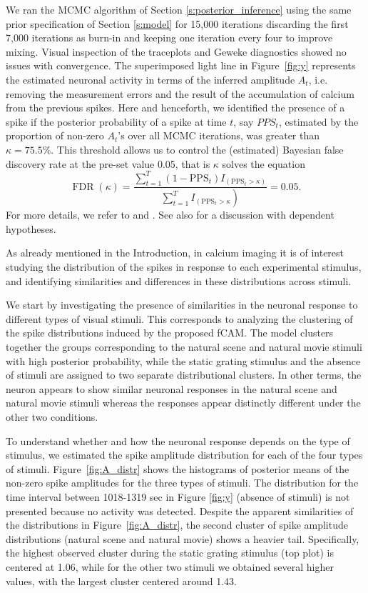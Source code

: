 We ran the MCMC algorithm of Section \ref{s:posterior_inference} using the same prior specification of Section \ref{s:model} for 15{,}000 iterations discarding the first 7{,}000 iterations as burn-in and keeping one iteration every four to improve mixing.  Visual inspection of the traceplots and Geweke diagnostics showed no issues with convergence. 
%
The superimposed light line in Figure~\ref{fig:y} represents the estimated neuronal activity in terms of the inferred amplitude $A_t$, i.e. removing the measurement errors and the result of the accumulation of calcium from the previous spikes. Here and henceforth, we identified the presence of a spike if the  posterior probability of a spike at time $t$, say $PPS_t$, estimated by the proportion of non-zero $A_t$'s over all MCMC iterations, was greater than  $\kappa=75.5\%$. This threshold allows us to control the (estimated) Bayesian false discovery rate at the pre-set value 0.05, that is $\kappa$ solves the equation $$\operatorname{FDR}\left(\kappa\right)=\frac{\sum_{t=1}^{T}\left(1-\mathrm{PPS}_{t}\right) I_{\left(\mathrm{PPS}_{t}>\kappa\right)}}{ \left.\sum_{t=1}^{T} I_{\left(\mathrm{PPS}_{t}>\kappa\right.}\right)}=0.05.$$ For more details, we refer to \textcite{newton2004} and \textcite{Muller07}. See also \textcite{SunReich2015} for a discussion with dependent hypotheses.
%

%
As already mentioned in the Introduction, in calcium imaging it is of interest studying the distribution of the spikes in response to each experimental stimulus, and identifying similarities and differences in these distributions across stimuli. 

We start by investigating the presence of similarities in the neuronal response to different types of visual stimuli. This corresponds to analyzing the clustering of the spike distributions induced by the proposed fCAM. The model clusters together the groups corresponding to the natural scene and natural movie stimuli with high posterior probability, while the static grating stimulus and the absence of stimuli are assigned to two separate distributional clusters. In other terms, the neuron appears to show similar neuronal responses in the natural scene and natural movie stimuli whereas the responses appear distinctly different under the other two conditions. 



To understand whether and how the neuronal response depends on the type of stimulus, we estimated the spike amplitude distribution for each of the four types of stimuli. Figure~\ref{fig:A_distr} shows the histograms of posterior means of the non-zero spike amplitudes for the three types of stimuli. The distribution for the time interval between 1018-1319 sec in Figure \ref{fig:y} (absence of stimuli) is not presented because no activity was detected. Despite the apparent similarities of the distributions in Figure~\ref{fig:A_distr}, the second cluster of spike amplitude distributions (natural scene and natural movie) shows a heavier tail. 
Specifically, the highest observed cluster during the static grating stimulus (top plot) is centered at 1.06, while for the other two stimuli we obtained several higher values, with the largest cluster centered around 1.43. 

